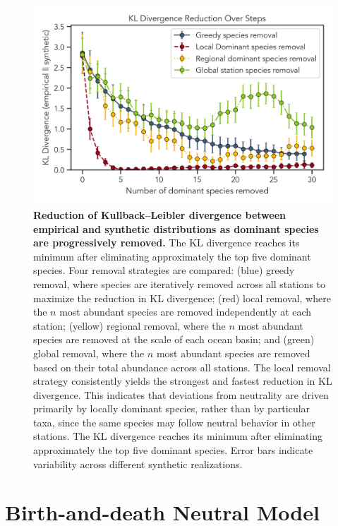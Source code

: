 \documentclass[%
 preprint,            %
 superscriptaddress, %
 amsmath,amssymb,    %
 aps,                %
 pra,                %
 floatfix,           %
]{revtex4-2}
\begin{document}
\begin{figure}
    \centering
    \includegraphics[width=0.75\linewidth]{fig/KL_divergence_reduction_comparison.png}
    \caption{\textbf{Reduction of Kullback–Leibler divergence between empirical and synthetic distributions as dominant species are progressively removed.} The KL divergence reaches its minimum after eliminating approximately the top five dominant species. Four removal strategies are compared: (blue) greedy removal, where species are iteratively removed across all stations to maximize the reduction in KL divergence; (red) local removal, where the $n$ most abundant species are removed independently at each station; (yellow) regional removal, where the $n$ most abundant species are removed at the scale of each ocean basin; and (green) global removal, where the $n$ most abundant species are removed based on their total abundance across all stations. The local removal strategy consistently yields the strongest and fastest reduction in KL divergence. This indicates that deviations from neutrality are driven primarily by locally dominant species, rather than by particular taxa, since the same species may follow neutral behavior in other stations. The KL divergence reaches its minimum after eliminating approximately the top five dominant species. Error bars indicate variability across different synthetic realizations.}
    \label{fig:placeholder}
\end{figure}

\appendix

\section{Birth-and-death Neutral Model}
\end{document}
